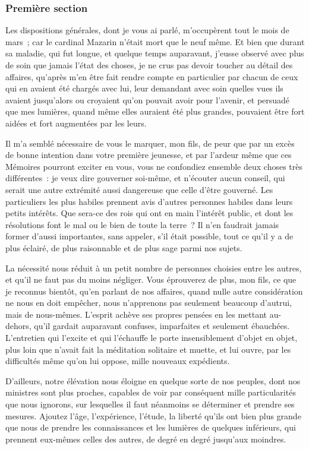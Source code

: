 \documentclass[french,twoside]{book} %
\begin{document}
\subsubsection[{Première section}]{Première section}
\noindent Les dispositions générales, dont je vous ai parlé, m’occupèrent tout le mois de mars ; car le cardinal Mazarin n’était mort que le neuf même. Et bien que durant sa maladie, qui fut longue, et quelque temps auparavant, j’eusse observé avec plus de soin que jamais l’état des choses, je ne crus pas devoir toucher au détail des affaires, qu’après m’en être fait rendre compte en particulier par chacun de ceux qui en avaient été chargés avec lui, leur demandant avec soin quelles vues ils avaient jusqu’alors ou croyaient qu’on pouvait avoir pour l’avenir, et persuadé que mes lumières, quand même elles auraient été plus grandes, pouvaient être fort aidées et fort augmentées par les leurs.\par
Il m’a semblé nécessaire de vous le marquer, mon fils, de peur que par un excès de bonne intention dans votre première jeunesse, et par l’ardeur même que ces Mémoires pourront exciter en vous, vous ne confondiez ensemble deux choses très différentes : je veux dire gouverner soi-même, et n’écouter aucun conseil, qui serait une autre extrémité aussi dangereuse que celle d’être gouverné. Les particuliers les plus habiles prennent avis d’autres personnes habiles dans leurs petits intérêts. Que sera-ce des rois qui ont en main l’intérêt public, et dont les résolutions font le mal ou le bien de toute la terre ? Il n’en faudrait jamais former d’aussi importantes, sans appeler, s’il était possible, tout ce qu’il y a de plus éclairé, de plus raisonnable et de plus sage parmi nos sujets.\par
La nécessité nous réduit à un petit nombre de personnes choisies entre les autres, et qu’il ne faut pas du moins négliger. Vous éprouverez de plus, mon fils, ce que je reconnus bientôt, qu’en parlant de nos affaires, quand nulle autre considération ne nous en doit empêcher, nous n’apprenons pas seulement beaucoup d’autrui, mais de nous-mêmes. L’esprit achève ses propres pensées en les mettant au-dehors, qu’il gardait auparavant confuses, imparfaites et seulement ébauchées. L’entretien qui l’excite et qui l’échauffe le porte insensiblement d’objet en objet, plus loin que n’avait fait la méditation solitaire et muette, et lui ouvre, par les difficultés même qu’on lui oppose, mille nouveaux expédients.\par
D’ailleurs, notre élévation nous éloigne en quelque sorte de nos peuples, dont nos ministres sont plus proches, capables de voir par conséquent mille particularités que nous ignorons, sur lesquelles il faut néanmoins se déterminer et prendre ses mesures. Ajoutez l’âge, l’expérience, l’étude, la liberté qu’ils ont bien plus grande que nous de prendre les connaissances et les lumières de quelques inférieurs, qui prennent eux-mêmes celles des autres, de degré en degré jusqu’aux moindres.\par
\end{document}

